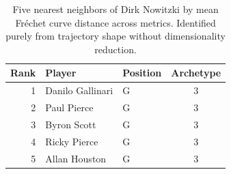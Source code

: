 \begin{table}[htbp]
  \centering\small
  \begin{tabular}{rllc}
    \toprule
    Rank & Player & Position & Archetype \\
    \midrule
    1 & Danilo Gallinari & G & 3 \\
    2 & Paul Pierce & G & 3 \\
    3 & Byron Scott & G & 3 \\
    4 & Ricky Pierce & G & 3 \\
    5 & Allan Houston & G & 3 \\
    \bottomrule
  \end{tabular}
  \caption{Five nearest neighbors of Dirk Nowitzki by mean Fr\'{e}chet curve distance across metrics. Identified purely from trajectory shape without dimensionality reduction.}
  \label{tab:Dirk_Nowitzki_frechet_curve_neighbors}
\end{table}

